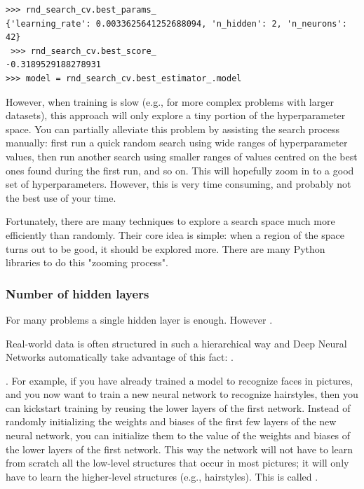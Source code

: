 \begin{lstlisting}
>>> rnd_search_cv.best_params_
{'learning_rate': 0.0033625641252688094, 'n_hidden': 2, 'n_neurons': 42}
 >>> rnd_search_cv.best_score_
-0.3189529188278931
>>> model = rnd_search_cv.best_estimator_.model
\end{lstlisting}

However, when training is slow (e.g., for more complex problems with larger datasets), this approach will only explore a tiny portion of the hyperparameter space. You can partially alleviate this problem by assisting the search process manually: first run a quick random search using wide ranges of hyperparameter values, then run another search using smaller ranges of values centred on the best ones found during the first run, and so on. This will hopefully zoom in to a good set of hyperparameters. However, this is very time consuming, and probably not the best use of your time.

Fortunately, there are many techniques to explore a search space much more efficiently than randomly. Their core idea is simple: when a region of the space turns out to be good, it should be explored more. There are many Python libraries to do this "zooming process".

\subsubsection{Number of hidden layers}
For many problems a single hidden layer is enough. However .

Real-world data is often structured in such a hierarchical way and Deep Neural Networks automatically take advantage of this fact: .

. For example, if you have already trained a model to recognize faces in pictures, and you now want to train a new neural network to recognize hairstyles, then you can kickstart training by reusing the lower layers of the first network. Instead of randomly initializing the weights and biases of the first few layers of the new neural network, you can initialize them to the value of the weights and biases of the lower layers of the first network. This way the network will not have to learn from scratch all the low-level structures that occur in most pictures; it will only have to learn the higher-level structures (e.g., hairstyles). This is called .

